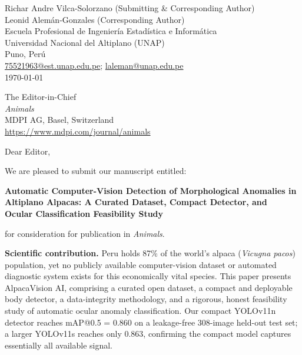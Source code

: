 \documentclass[12pt, letterpaper]{article}
\begin{document}
\begin{flushright}
  Richar Andre Vilca-Solorzano (Submitting \& Corresponding Author)\\
  Leonid Alem\'an-Gonzales (Corresponding Author)\\
  Escuela Profesional de Ingenier\'ia Estad\'istica e Inform\'atica\\
  Universidad Nacional del Altiplano (UNAP)\\
  Puno, Per\'u\\
  \href{mailto:75521963@est.unap.edu.pe}{75521963@est.unap.edu.pe};
  \href{mailto:laleman@unap.edu.pe}{laleman@unap.edu.pe}\\[6pt]
  \today
\end{flushright}

\bigskip

The Editor-in-Chief\\
\textit{Animals}\\
MDPI AG, Basel, Switzerland\\
\href{https://www.mdpi.com/journal/animals}{https://www.mdpi.com/journal/animals}

\bigskip

Dear Editor,

We are pleased to submit our manuscript entitled:

\begin{center}
\textbf{Automatic Computer-Vision Detection of Morphological Anomalies in \\
Altiplano Alpacas: A Curated Dataset, Compact Detector, and \\
Ocular Classification Feasibility Study}
\end{center}

for consideration for publication in \textit{Animals}.

\textbf{Scientific contribution.}
Peru holds 87\% of the world's alpaca (\textit{Vicugna pacos}) population, yet no
publicly available computer-vision dataset or automated diagnostic system exists for
this economically vital species. This paper presents AlpacaVision AI, comprising a
curated open dataset, a compact and deployable body detector, a data-integrity
methodology, and a rigorous, honest feasibility study of automatic ocular anomaly
classification. Our compact YOLOv11n detector reaches mAP@0.5 = 0.860 on a
leakage-free 308-image held-out test set; a larger YOLOv11s reaches only 0.863,
confirming the compact model captures essentially all available signal.
\end{document}
